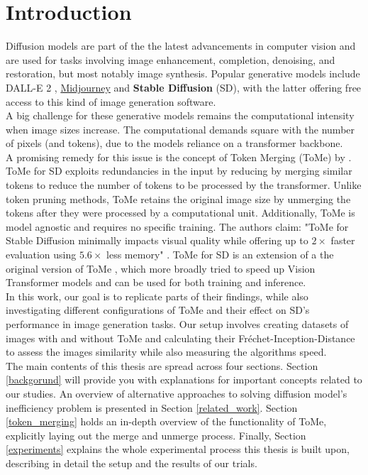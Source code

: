 \section{Introduction}
Diffusion models are part of the the latest advancements in computer vision and are used for tasks involving image enhancement, completion, denoising, and restoration, but most notably image synthesis. Popular generative models include DALL-E 2 \cite{ramesh2022hierarchical}, \href{https://www.midjourney.com}{Midjourney} and \textbf{Stable Diffusion} (SD), with the latter offering free access to this kind of image generation software.\\
A big challenge for these generative models remains the computational intensity when image sizes increase. The computational demands square with the number of pixels (and tokens), due to the models reliance on a transformer backbone.\\
A promising remedy for this issue is the concept of Token Merging (ToMe) by \cite{bolya2023tomesd}. ToMe for SD exploits redundancies in the input by reducing by merging similar tokens to reduce the number of tokens to be processed by the transformer. Unlike token pruning methods, ToMe retains the original image size by unmerging the tokens after they were processed by a computational unit. Additionally, ToMe is model agnostic and requires no specific training. The authors claim: "ToMe for Stable Diffusion minimally impacts visual quality while offering up to $2 \times$ faster evaluation using $5.6 \times$ less memory" \cite{bolya2023tomesd}. ToMe for SD is an extension of a the original version of ToMe \cite{bolya2023tome}, which more broadly tried to speed up Vision Transformer models \cite{dosovitskiy2020image} and can be used for both training and inference.\\
In this work, our goal is to replicate parts of their findings, while also investigating different configurations of ToMe and their effect on SD's performance in image generation tasks. Our setup involves creating datasets of images with and without ToMe and calculating their Fréchet-Inception-Distance to assess the images similarity while also measuring the algorithms speed.\\
The main contents of this thesis are spread across four sections. Section \ref{backgorund} will provide you with explanations for important concepts related to our studies. An overview of alternative approaches to solving diffusion model's inefficiency problem is presented in Section \ref{related_work}. Section \ref{token_merging} holds an in-depth overview of the functionality of ToMe, explicitly laying out the merge and unmerge process. Finally, Section \ref{experiments} explains the whole experimental process this thesis is built upon, describing in detail the setup and the results of our trials.\\
